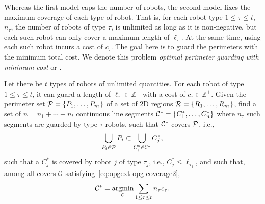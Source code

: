 Whereas the first model caps the number of robots, the second
model fixes the maximum coverage of each type of robot. That is, for 
each robot type $1 \le \tau \le t$, $n_{\tau}$, the number of robots of type $\tau$,
is unlimited as long as it is non-negative, but each such robot can only cover 
a maximum length of $\ell_{\tau}$. 
At the same time, using each such robot incurs a cost of $c_{\tau}$. The 
goal here is to guard the perimeters with the minimum total cost. We 
denote this problem {\em optimal perimeter guarding with minimum 
	cost} or \opgmc. 

\begin{problem} Let there be $t$ types of robots of unlimited quantities. 
	For each robot of type $1\le \tau \le t$, it can guard a length of 
	$\ell_{\tau}\in\mathbb{Z^+}$ with a cost of $c_{\tau}\in\mathbb{Z^+}$. Given the perimeter set
	$\P = \{P_1, \ldots, P_m\}$ of a set of 2D regions $\R =\{R_1, \ldots, 
	R_m\}$, find a set of $n = n_1 + \cdots + n_t$ continuous line segments 
	$\C^* = \{C_1^*, \ldots, C_n^*\}$ where $n_{\tau}$ such segments are 
	guarded by type $\tau$ robots, such that $\C^*$ covers $\P$, i.e., 
	\begin{align}\label{eq:opgext-opg-coverage2}
	\bigcup_{P_i \in \P} P_i  \subset \bigcup_{C_j^* \in \C^*} C_j^*,
	\end{align}
	such that a $C_j^*$ is covered by robot $j$ of type $\tau_j$, i.e., 
	$C_j^* \le \ell_{\tau_j}$, and such that,
	among all covers $\C$ satisfying~\eqref{eq:opgext-opg-coverage2}, 
	\begin{align}\label{eq:opgext-opg-objective2}
	\C^* = \underset{\C}{\mathrm{argmin}} \sum_{1 \le \tau \le t} 
	n_{\tau}c_{\tau}.
	\end{align}
\end{problem}
